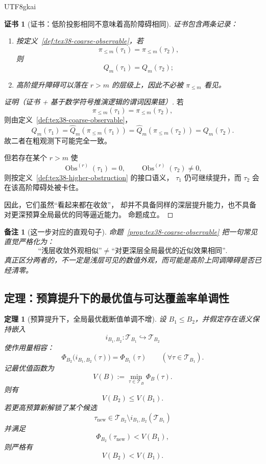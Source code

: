 \documentclass[12pt]{article}
\newtheorem{theorem}{定理}[section]
\newtheorem{remark}{备注}[section]
\newtheorem{Certificate}{证书}[section]
\newcommand{\Obs}{\operatorname{Obs}}
\begin{document}
\begin{CJK*}{UTF8}{gkai}
\begin{Certificate}[证书：低阶投影相同不意味着高阶障碍相同]
\label{cert:tex38-coarse-observable}
证书包含两条记录：
\begin{enumerate}
  \item 按定义~\ref{def:tex38-coarse-observable}，若
  \[
    \pi_{\le m}(\tau_1)=\pi_{\le m}(\tau_2),
  \]
  则
  \[
    Q_m(\tau_1)=Q_m(\tau_2);
  \]
  \item 高阶提升障碍可以落在 $r>m$ 的层级上，因此不必被 $\pi_{\le m}$ 看见。
\end{enumerate}
\end{Certificate}

\begin{proof}[证明（证书 + 基于数学符号推演逻辑的谓词因果链）]
若
\[
  \pi_{\le m}(\tau_1)=\pi_{\le m}(\tau_2),
\]
则由定义~\ref{def:tex38-coarse-observable}，
\[
  Q_m(\tau_1)
  =
  \widehat Q_m(\pi_{\le m}(\tau_1))
  =
  \widehat Q_m(\pi_{\le m}(\tau_2))
  =
  Q_m(\tau_2).
\]
故二者在粗观测下可能完全一致。

但若存在某个 $r>m$ 使
\[
  \Obs^{(r)}(\tau_1)=0,
  \qquad
  \Obs^{(r)}(\tau_2)\neq 0,
\]
则按定义~\ref{def:tex38-higher-obstruction} 的接口语义，
$\tau_1$ 仍可继续提升，而 $\tau_2$ 会在该高阶障碍处被卡住。

因此，它们虽然“看起来都在收敛”，
却并不具备同样的深层提升能力，也不具备对更深预算全局最优的同等逼近能力。
命题成立。
\end{proof}

\begin{remark}[这一步对应的直观句子]
命题~\ref{prop:tex38-coarse-observable} 把一句常见直觉严格化为：
\[
  \text{“浅层收敛外观相似”}
  \neq
  \text{“对更深层全局最优的近似效果相同”}.
\]
真正区分两者的，不一定是浅层可见的数值外观，而可能是高阶上同调障碍是否已经清零。
\end{remark}

\subsection{定理：预算提升下的最优值与可达覆盖率单调性}
\label{subsec:tex38-budget-monotonicity}

\begin{theorem}[预算提升下，全局最优截断值单调不增]
\label{thm:tex38-budget-value}
设 $B_1\le B_2$，并假定存在语义保持嵌入
\[
  i_{B_1,B_2}:\mathcal T_{B_1}\hookrightarrow \mathcal T_{B_2}
\]
使作用量相容：
\[
  \Phi_{B_2}\bigl(i_{B_1,B_2}(\tau)\bigr)=\Phi_{B_1}(\tau)
  \qquad
  (\forall \tau\in\mathcal T_{B_1}).
\]
记最优值函数为
\[
  V(B):=
  \min_{\tau\in\mathcal T_B}\Phi_B(\tau).
\]
则有
\[
  V(B_2)\le V(B_1).
\]
若更高预算新解锁了某个候选
\[
  \tau_{\mathrm{new}}\in\mathcal T_{B_2}\setminus i_{B_1,B_2}(\mathcal T_{B_1})
\]
并满足
\[
  \Phi_{B_2}(\tau_{\mathrm{new}})<V(B_1),
\]
则严格有
\[
  V(B_2)<V(B_1).
\]
\end{theorem}


\end{CJK*}
\end{document}
